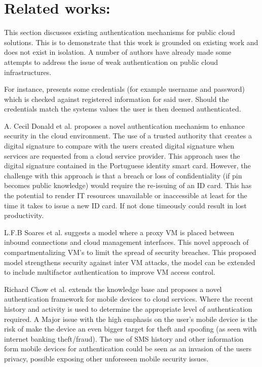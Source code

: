 \documentclass[11pt]{article}
\begin{document}
\section{Related works:}
This section discusses existing authentication mechanisms for public cloud solutions. This is to demonstrate that this work is grounded on existing work and does not exist in isolation. A number of authors have already made some attempts to address the issue of weak authentication on public cloud infrastructures.

For instance, \cite{Archer2009} presents some credentials (for example username and password) which is checked against registered information for said user. Should the credentials match the systems values the user is then deemed authenticated.

A. Cecil Donald et al. \cite{A2014} proposes a novel authentication  mechanism to enhance security in the cloud environment. The use of a trusted authority that creates a digital signature to compare with the users created digital signature when services are requested from a cloud service provider. This approach uses the digital signature  contained in the Portuguese identity smart card. However, the challenge with this approach is that a breach or loss of confidentiality (if pin becomes public knowledge) would require the re-issuing of an ID card. This has the potential to render IT resources unavailable or inaccessible at least for the time it takes to issue a new ID card. If not done timeously could result in lost productivity.

L.F.B Soares et al. \cite{Soares2013} suggests a model where a proxy  VM is placed between inbound connections and cloud management interfaces. This novel approach of compartmentalizing VM's to limit the spread of security breaches. This proposed model strengthens security against inter VM attacks, the model can be extended to include multifactor authentication to improve VM access control.

Richard Chow et al. \cite{Chow2010} extends the knowledge base and proposes a novel authentication framework for mobile devices to cloud services. Where the recent history and activity is used to determine the appropriate level of authentication required. A Major issue with the high emphasis on the user's mobile device is the risk of make the device an even bigger target for theft and spoofing (as seen with internet banking theft/fraud). The use of SMS history and other information form mobile devices for authentication could be seen as an invasion of the users privacy, possible exposing other unforeseen mobile security issues.
\end{document}
